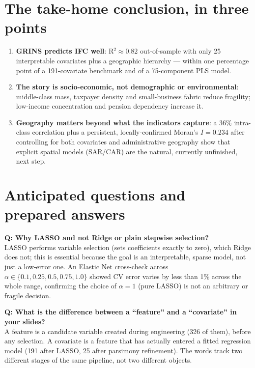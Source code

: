 \documentclass[11pt,a4paper]{article}
\begin{document}
\section{The take-home conclusion, in three points}

\begin{enumerate}[leftmargin=2em]
  \item \textbf{GRINS predicts IFC well}: R$^2 \approx 0.82$
  out-of-sample with only 25 interpretable covariates plus a
  geographic hierarchy --- within one percentage point of a
  191-covariate benchmark and of a 75-component PLS model.
  \item \textbf{The story is socio-economic, not demographic or
  environmental}: middle-class mass, taxpayer density and
  small-business fabric reduce fragility; low-income concentration
  and pension dependency increase it.
  \item \textbf{Geography matters beyond what the indicators
  capture}: a 36\% intra-class correlation plus a persistent,
  locally-confirmed Moran's $I = 0.234$ after controlling for both
  covariates and administrative geography show that explicit
  spatial models (SAR/CAR) are the natural, currently unfinished,
  next step.
\end{enumerate}

\section{Anticipated questions and prepared answers}

\textbf{Q: Why LASSO and not Ridge or plain stepwise selection?}\\
LASSO performs variable selection (sets coefficients exactly to
zero), which Ridge does not; this is essential because the goal is
an interpretable, sparse model, not just a low-error one. An Elastic
Net cross-check across $\alpha \in \{0.1, 0.25, 0.5, 0.75, 1.0\}$
showed CV error varies by less than 1\% across the whole range,
confirming the choice of $\alpha=1$ (pure LASSO) is not an arbitrary
or fragile decision.

\textbf{Q: What is the difference between a ``feature'' and a
``covariate'' in your slides?}\\
A feature is a candidate variable created during engineering (326 of
them), before any selection. A covariate is a feature that has
actually entered a fitted regression model (191 after LASSO, 25
after parsimony refinement). The words track two different stages
of the same pipeline, not two different objects.
\end{document}
